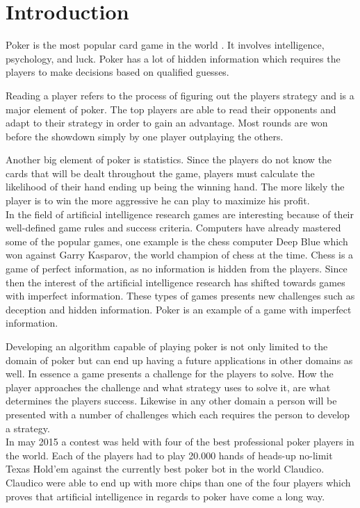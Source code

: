 \section*{Introduction}
Poker is the most popular card game in the world \cite{poker-popular}. It involves intelligence, psychology, and luck. Poker has a lot of hidden information which requires the players to make decisions based on qualified guesses.  

Reading a player refers to the process of figuring out the players strategy and is a major element of poker. The top players are able to read their opponents and adapt to their strategy in order to gain an advantage. Most rounds are won before the showdown simply by one player outplaying the others. 

Another big element of poker is statistics. Since the players do not know the cards that will be dealt throughout the game, players must calculate the likelihood of their hand ending up being the winning hand. The more likely the player is to win the more aggressive he can play to maximize his profit.\\


In the field of artificial intelligence research games are interesting because of their well-defined game rules and success criteria.
Computers have already mastered some of the popular games, one example is the chess computer Deep Blue which won against Garry Kasparov, the world champion of chess at the time.
Chess is a game of perfect information, as no information is hidden from the players.
Since then the interest of the artificial intelligence research has shifted towards games with imperfect information. These types of games presents new challenges such as deception and hidden information. Poker is an example of a game with imperfect information.


Developing an algorithm capable of playing poker is not only limited to the domain of poker but can end up having a future applications in other domains as well. In essence a game presents a challenge for the players to solve. How the player approaches the challenge and what strategy uses to solve it, are what determines the players success. Likewise in any other domain a person will be presented with a number of challenges which each requires the person to develop a strategy.\\

In may 2015 a contest was held with four of the best professional poker players in the world. Each of the players had to play 20.000 hands of heads-up no-limit Texas Hold'em against the currently best poker bot in the world Claudico. Claudico were able to end up with more chips than one of the four players which proves that artificial intelligence in regards to poker have come a long way.\\


